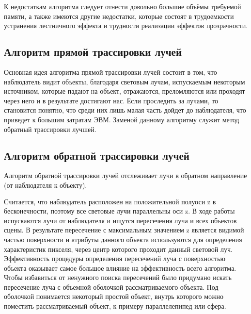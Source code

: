 К недостаткам алгоритма следует отнести довольно большие объёмы требуемой памяти, а также имеются другие недостатки, которые состоят в трудоемкости устранения лестничного эффекта и трудности реализации эффектов прозрачности.

\subsection{Алгоритм прямой трассировки лучей}

Основная идея алгоритма прямой трассировки лучей состоит в том, что наблюдатель видит объекты, благодаря световым лучам, испускаемым некоторым источником, которые падают на объект, отражаются, преломляются или проходят через него и в результате достигают нас. Если проследить за лучами, то становится понятно, что среди них лишь малая часть дойдет до наблюдателя, что приведет к большим затратам ЭВМ. Заменой данному алгоритму служит метод обратный трассировки лучшей.

\subsection{Алгоритм обратной трассировки лучей}

Алгоритм обратной трассировки лучей отслеживает лучи в обратном направление (от наблюдателя к объекту). 

Считается, что наблюдатель расположен на положительной полуоси z в бесконечности, поэтому все световые лучи параллельны оси z. В ходе работы испускаются лучи от наблюдателя и ищутся пересечения луча и всех объектов сцены. В результате пересечение с максимальным значением z является видимой частью поверхности и атрибуты данного объекта используются для определения характеристик пикселя, через центр которого проходит данный световой луч. Эффективность процедуры определения пересечений луча с поверхностью объекта оказывает самое большое влияние на эффективность всего алгоритма. Чтобы избавиться от ненужного поиска пересечений было придумано искать пересечение луча с объемной оболочкой рассматриваемого объекта. Под оболочкой понимается некоторый простой объект, внутрь которого можно поместить рассматриваемый объект, к примеру параллелепипед или сфера.

\begin{figure}[ht!]
\end{figure}

